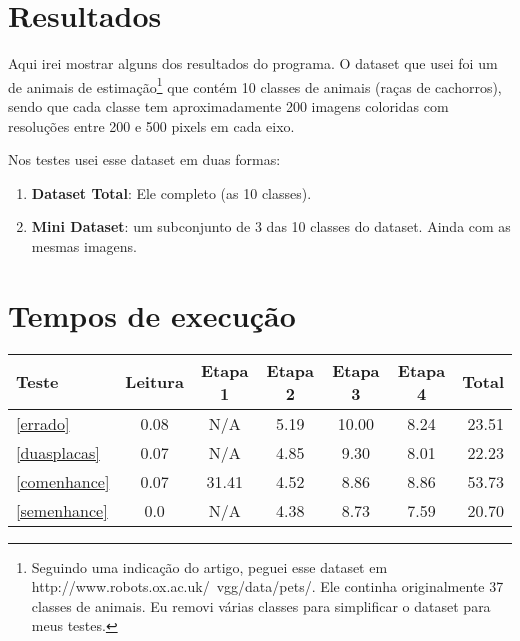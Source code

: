 \section{Resultados}
Aqui irei mostrar alguns dos resultados do programa. O dataset que usei foi um de
animais de estimação\footnote{
Seguindo uma indicação do artigo, peguei esse dataset em http://www.robots.ox.ac.uk/~vgg/data/pets/.
Ele continha originalmente 37 classes de animais. Eu removi várias classes para simplificar o dataset
para meus testes.
} que contém 10 classes de animais (raças de cachorros),
sendo que cada classe tem aproximadamente 200 imagens coloridas com resoluções entre
200 e 500 pixels em cada eixo.

Nos testes usei esse dataset em duas formas:
\begin{enumerate}
  \item \textbf{Dataset Total}: Ele completo (as 10 classes).
  \item \textbf{Mini Dataset}: um subconjunto de 3 das 10 classes do dataset. Ainda com as mesmas imagens.
\end{enumerate}


\section{Tempos de execução}
\begin{tabular}{ | l | c | c | c | c | c | r | }
\hline
Teste       & Leitura & Etapa 1 & Etapa 2 & Etapa 3 & Etapa 4 & Total \\
\hline
\ref{errado} & 0.08 & N/A & 5.19 & 10.00 & 8.24 & 23.51 \\
\hline
\ref{duasplacas} & 0.07 & N/A & 4.85 & 9.30 & 8.01 & 22.23 \\
\hline
\ref{comenhance} & 0.07 & 31.41 & 4.52 & 8.86 & 8.86 & 53.73 \\
\hline
\ref{semenhance} & 0.0 & N/A & 4.38 & 8.73 & 7.59 & 20.70 \\
\hline
\end{tabular}


